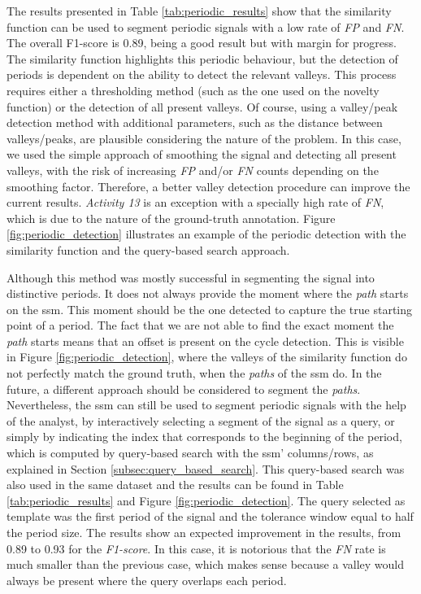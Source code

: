 The results presented in Table \ref{tab:periodic_results} show that the similarity function can be used to segment periodic signals with a low rate of \textit{FP} and \textit{FN}. The overall F1-score is 0.89, being a good result but with margin for progress. The similarity function highlights this periodic behaviour, but the detection of periods is dependent on the ability to detect the relevant valleys. This process requires either a thresholding method (such as the one used on the novelty function) or the detection of all present valleys. Of course, using a valley/peak detection method with additional parameters, such as the distance between valleys/peaks, are plausible considering the nature of the problem. In this case, we used the simple approach of smoothing the signal and detecting all present valleys, with the risk of increasing \textit{FP} and/or \textit{FN} counts depending on the smoothing factor. Therefore, a better valley detection procedure can improve the current results. \textit{Activity 13} is an exception with a specially high rate of \textit{FN}, which is due to the nature of the ground-truth annotation. Figure \ref{fig:periodic_detection} illustrates an example of the periodic detection with the similarity function and the query-based search approach.

Although this method was mostly successful in segmenting the signal into distinctive periods. It does not always provide the moment where the \textit{path} starts on the \gls{ssm}. This moment should be the one detected to capture the true starting point of a period. The fact that we are not able to find the exact moment the \textit{path} starts means that an offset is present on the cycle detection. This is visible in Figure \ref{fig:periodic_detection}, where the valleys of the similarity function do not perfectly match the ground truth, when the \textit{paths} of the \gls{ssm} do. In the future, a different approach should be considered to segment the \textit{paths}. Nevertheless, the \gls{ssm} can still be used to segment periodic signals with the help of the analyst, by interactively selecting a segment of the signal as a query, or simply by indicating the index that corresponds to the beginning of the period, which is computed by query-based search with the \gls{ssm}' columns/rows, as explained in Section \ref{subsec:query_based_search}. This query-based search was also used in the same dataset and the results can be found in Table \ref{tab:periodic_results} and Figure \ref{fig:periodic_detection}. The query selected as template was the first period of the signal and the tolerance window equal to half the period size. The results show an expected improvement in the results, from 0.89 to 0.93 for the \textit{F1-score}. In this case, it is notorious that the \textit{FN} rate is much smaller than the previous case, which makes sense because a valley would always be present where the query overlaps each period.


